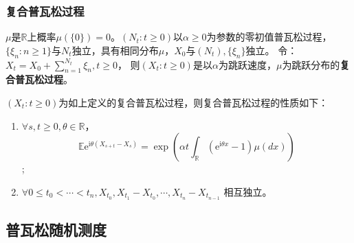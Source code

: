 \documentclass[main]{subfiles}
\begin{document}
\subsubsection{复合普瓦松过程}
\begin{definition}\label{def:复合普瓦松过程}
  \(\mu\)是\(\mathbb{R}\)上概率\(\mu(\{0\})=0\)。\((N_t: t \geq 0)\)以\(\alpha \geq 0\)为参数的零初值普瓦松过程，
  \(\{\xi_n:n \geq 1\}\)与\(N_t\)独立，具有相同分布\(\mu\)，\(X_0\)与\((N_t),\{\xi_n\}\)独立。
  令：\(X_t=X_0 + \sum_{n=1}^{N_t}\xi_n, t \geq 0\)，
  则\((X_t: t \geq 0)\)是以\(\alpha\)为跳跃速度，\(\mu\)为跳跃分布的\textbf{复合普瓦松过程}。
\end{definition}
\begin{theorem}\label{the:复合普瓦松过程的性质}
  \((X_t:t \geq 0)\)为如上定义的复合普瓦松过程，则复合普瓦松过程的性质如下：
  \begin{enumerate}
    \item \(\forall s,t \geq 0, \theta \in \mathbb{R}\)，\[
        \mathbb{E}\mathrm{e}^{\mathrm{i}\theta(X_{s + t}-X_s)}=\exp(\alpha t \int_{\mathbb{R}}(\mathrm{e}^{\mathrm{i}\theta x}-1)\mu(dx))\] ;
    \item \(\forall 0 \leq t_0 <\cdots<t_n, X_{t_0},X_{t_1}-X_{t_0},\cdots,X_{t_n}-X_{t_{n-1}} \) 相互独立。
  \end{enumerate}
\end{theorem}
\subsection{普瓦松随机测度}
\end{document}
